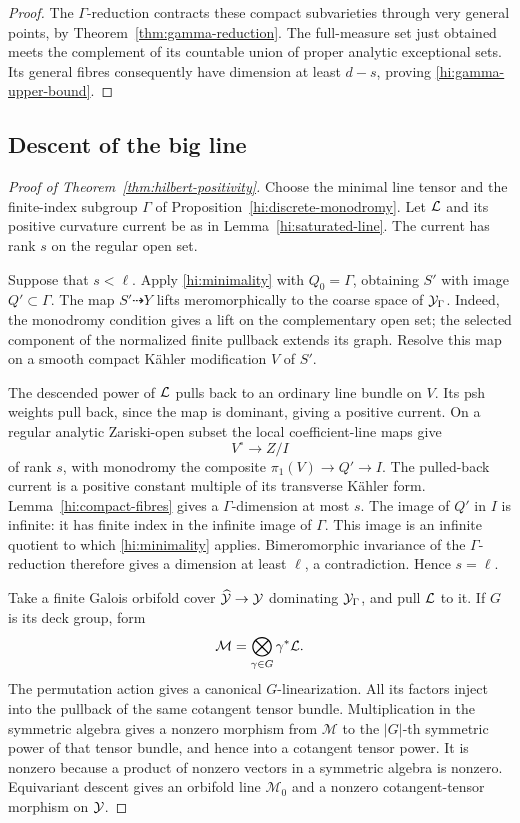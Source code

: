 \begin{proof}
The \(\Gamma\)-reduction contracts these compact subvarieties through
very general points, by Theorem~\ref{thm:gamma-reduction}.
The full-measure set just obtained meets the complement of its
countable union of proper analytic exceptional sets. Its general
fibres consequently have dimension at least \(d-s\), proving
\eqref{hi:gamma-upper-bound}.
\end{proof}

\subsection{Descent of the big line}

\begin{proof}[Proof of Theorem~\ref{thm:hilbert-positivity}]
Choose the minimal line tensor and the finite-index subgroup
\(\Gamma\) of Proposition~\ref{hi:discrete-monodromy}.
Let \(\mathcal L\) and its positive curvature current be as in
Lemma~\ref{hi:saturated-line}. The current has rank \(s\) on the
regular open set.

Suppose that \(s<\ell\). Apply \eqref{hi:minimality} with
\(Q_0=\Gamma\), obtaining \(S'\) with image \(Q'\subset\Gamma\).
The map \(S'\dashrightarrow Y\) lifts meromorphically to the
coarse space of \(\mathcal Y_\Gamma\). Indeed, the monodromy condition
gives a lift on the complementary open set; the selected component
of the normalized finite pullback extends its graph.
Resolve this map on a smooth compact K\"ahler modification \(V\)
of \(S'\).

The descended power of \(\mathcal L\) pulls back to an ordinary line
bundle on \(V\). Its psh weights pull back, since the map is
dominant, giving a positive current. On a regular analytic
Zariski-open subset the local coefficient-line maps give
\[
 V^\circ\longrightarrow Z/I
\]
of rank \(s\), with monodromy the composite
\(\pi_1(V)\to Q'\to I\). The pulled-back current is a positive
constant multiple of its transverse K\"ahler form.
Lemma~\ref{hi:compact-fibres} gives a \(\Gamma\)-dimension at most
\(s\). The image of \(Q'\) in \(I\) is infinite: it has finite
index in the infinite image of \(\Gamma\).
This image is an infinite quotient to which \eqref{hi:minimality}
applies. Bimeromorphic invariance of the \(\Gamma\)-reduction
therefore gives a dimension at least \(\ell\), a contradiction.
Hence \(s=\ell\).

Take a finite Galois orbifold cover
\(\widehat{\mathcal Y}\to\mathcal Y\) dominating \(\mathcal Y_\Gamma\), and pull
\(\mathcal L\) to it. If \(G\) is its deck group, form
\[
 \mathcal M=\bigotimes_{\gamma\in G}\gamma^*\mathcal L.
\]
The permutation action gives a canonical \(G\)-linearization.
All its factors inject into the pullback of the same cotangent
tensor bundle. Multiplication in the symmetric algebra gives a
nonzero morphism from \(\mathcal M\) to the \(|G|\)-th symmetric
power of that tensor bundle, and hence into a cotangent tensor power.
It is nonzero because a product of nonzero vectors in a symmetric algebra is
nonzero. Equivariant descent gives an orbifold line \(\mathcal M_0\)
and a nonzero cotangent-tensor morphism on \(\mathcal Y\).


\end{proof}

